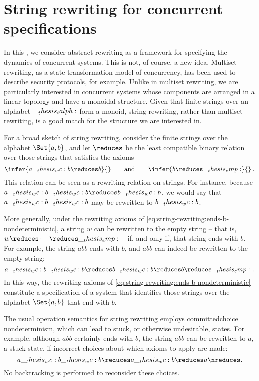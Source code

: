 \chapter{String rewriting for concurrent specifications}\label{ch:string-rewriting}

In this , we consider abstract rewriting as a framework for specifying the dynamics of concurrent systems.
This is not, of course, a new idea.
Multiset rewriting\autocites{Cervesato+Scedrov:IC09}{Meseguer:TCS92}, as a state-transformation model of concurrency, has been used to describe security protocols\autocites{Cervesato+:CSFW99}{Durgin+:JCS04}, for example.
Unlike in multiset rewriting, we are particularly interested in concurrent systems whose components are arranged in a linear topology and have a monoidal structure.
Given that finite strings over an alphabet $\__thesis_ialph:$ form a monoid, string rewriting, rather than multiset rewriting, is a good match for the structure we are interested in.

For a broad sketch of string rewriting, consider the finite strings over the alphabet $\Set{a,b}$, and let $\reduces$ be the least compatible binary relation over those strings that satisfies the axioms
\begin{equation}\label{eq:string-rewriting:ends-b-nondeterministic}
  \infer{a \wc b \reduces b}{}
  \qquad\text{and}\qquad
  \infer{b \reduces \emp}{}
  \:.
\end{equation}
This relation can be seen as a rewriting relation on strings.
For instance, because $a \wc b \wc b \reduces b \wc b$, we would say that $a \wc b \wc b$ may be rewritten to $b \wc b$.

More generally, under the rewriting axioms of \cref{eq:string-rewriting:ends-b-nondeterministic}, a string $w$ can be rewritten to the empty string -- that is, $w \reduces \dotsb \reduces \emp$ -- if, and only if, that string ends with $b$.
For example, the string $abb$ ends with $b$, and $abb$ can indeed be rewritten to the empty string:
\begin{equation*}
  a \wc b \wc b
    \reduces b \wc b
    \reduces b
    \reduces \emp
  \,.
\end{equation*}
In this way, the rewriting axioms of \cref{eq:string-rewriting:ends-b-nondeterministic} constitute a specification of a system that identifies those strings over the alphabet $\Set{a,b}$ that end with $b$.

The usual operation semantics for string rewriting employs committed\-choice nondeterminism, which
can lead to stuck, or otherwise undesirable, states.
For example, although $abb$ certainly ends with $b$, the string $abb$ can be rewritten to $a$, a stuck state, if incorrect choices about which axioms to apply are made:
\begin{equation*}
  a \wc b \wc b \reduces a \wc b \reduces a \nreduces
  \,\!.
\end{equation*}
No backtracking is performed to reconsider these choices.


